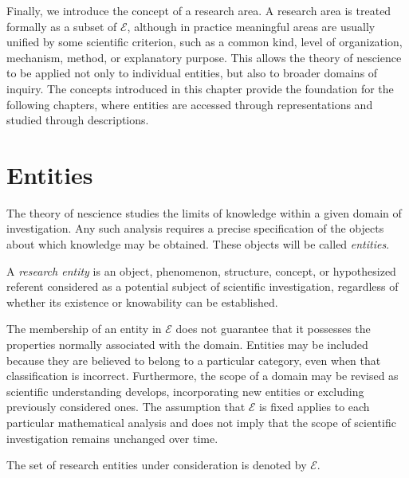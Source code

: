 Finally, we introduce the concept of a research area. A research area is treated formally as a subset of $\mathcal{E}$, although in practice meaningful areas are usually unified by some scientific criterion, such as a common kind, level of organization, mechanism, method, or explanatory purpose. This allows the theory of nescience to be applied not only to individual entities, but also to broader domains of inquiry. The concepts introduced in this chapter provide the foundation for the following chapters, where entities are accessed through representations and studied through descriptions.

%
%

\section{Entities}
\label{sec:descriptions}

The theory of nescience studies the limits of knowledge within a given domain of investigation. Any such analysis requires a precise specification of the objects about which knowledge may be obtained. These objects will be called \emph{entities}.

\begin{definition}
A \emph{research entity} is an object, phenomenon, structure, concept, or hypothesized referent considered as a potential subject of scientific investigation, regardless of whether its existence or knowability can be established.
\end{definition}

The membership of an entity in $\mathcal{E}$ does not guarantee that it possesses the properties normally associated with the domain. Entities may be included because they are believed to belong to a particular category, even when that classification is incorrect. Furthermore, the scope of a domain may be revised as scientific understanding develops, incorporating new entities or excluding previously considered ones. The assumption that $\mathcal{E}$ is fixed applies to each particular mathematical analysis and does not imply that the scope of scientific investigation remains unchanged over time.

\begin{notation}
The set of research entities under consideration is denoted by $\mathcal{E}$.
\end{notation}

